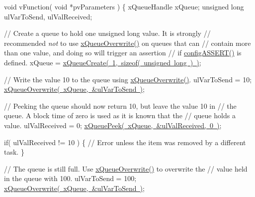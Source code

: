 \begin{DoxyPre} void vFunction( void *pvParameters )
 \{
 xQueueHandle xQueue;
 unsigned long ulVarToSend, ulValReceived;\end{DoxyPre}



\begin{DoxyPre}    // Create a queue to hold one unsigned long value.  It is strongly
    // recommended {\itshape not} to use \mbox{\hyperlink{queue_8h_a8e9ced123b5a0e37a36d3bbdb2e56b4e}{xQueueOverwrite()}} on queues that can
    // contain more than one value, and doing so will trigger an assertion
    // if \mbox{\hyperlink{_free_r_t_o_s_8h_a228c70cd48927d6ab730ed1a6dfbe35f}{configASSERT()}} is defined.
    xQueue = \mbox{\hyperlink{queue_8h_aeb858b824bd74a934ea7ebb81af2a6bb}{xQueueCreate( 1, sizeof( unsigned long ) )}};\end{DoxyPre}



\begin{DoxyPre}    // Write the value 10 to the queue using \mbox{\hyperlink{queue_8h_a8e9ced123b5a0e37a36d3bbdb2e56b4e}{xQueueOverwrite()}}.
    ulVarToSend = 10;
    \mbox{\hyperlink{queue_8h_a8e9ced123b5a0e37a36d3bbdb2e56b4e}{xQueueOverwrite( xQueue, &ulVarToSend )}};\end{DoxyPre}



\begin{DoxyPre}    // Peeking the queue should now return 10, but leave the value 10 in
    // the queue.  A block time of zero is used as it is known that the
    // queue holds a value.
    ulValReceived = 0;
    \mbox{\hyperlink{queue_8h_a2df70733bb875477cd9614c5b3446257}{xQueuePeek( xQueue, &ulValReceived, 0 )}};\end{DoxyPre}



\begin{DoxyPre}    if( ulValReceived != 10 )
    \{
        // Error unless the item was removed by a different task.
    \}\end{DoxyPre}



\begin{DoxyPre}    // The queue is still full.  Use \mbox{\hyperlink{queue_8h_a8e9ced123b5a0e37a36d3bbdb2e56b4e}{xQueueOverwrite()}} to overwrite the
    // value held in the queue with 100.
    ulVarToSend = 100;
    \mbox{\hyperlink{queue_8h_a8e9ced123b5a0e37a36d3bbdb2e56b4e}{xQueueOverwrite( xQueue, &ulVarToSend )}};\end{DoxyPre}



